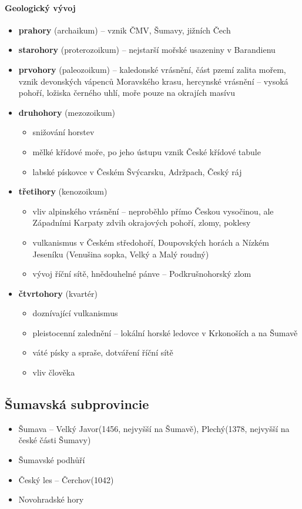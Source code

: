 \paragraph{Geologický vývoj}
\begin{itemize}
\item \textbf{prahory} (archaikum) -- vznik ČMV, Šumavy, jižních Čech
\item \textbf{starohory} (proterozoikum) -- nejstarší mořské usazeniny v Barandienu
\item \textbf{prvohory} (paleozoikum) --  kaledonské vrásnění, část pzemí zalita mořem, vznik devonských vápenců Moravského krasu, hercynské vrásnění -- vysoká pohoří, ložiska černého uhlí, moře pouze na okrajích masívu
\item \textbf{druhohory} (mezozoikum)  
	\begin{itemize}
	\item snižování horstev
	\item mělké křídové moře, po jeho ústupu vznik České křídové tabule
	\item labské pískovce v Českém Švýcarsku, Adržpach, Český ráj
	\end{itemize}
\item \textbf{třetihory} (kenozoikum)
	\begin{itemize}
	\item vliv alpinského vrásnění -- neproběhlo přímo Českou vysočinou, ale Západními Karpaty \ra zdvih okrajových pohoří, zlomy, poklesy
	\item vulkanismus v Českém středohoří, Doupovských horách a Nízkém Jeseníku (Venušina sopka, Velký a Malý roudný)
	\item vývoj říční sítě, hnědouhelné pánve -- Podkrušnohorský zlom
	\end{itemize}
\item \textbf{čtvrtohory} (kvartér)
	\begin{itemize}
	\item doznívající vulkanismus
	\item pleistocenní zalednění -- lokální horské ledovce v Krkonoších a na Šumavě
	\item váté písky a spraše, dotváření říční sítě
	\item vliv člověka
	\end{itemize}
\end{itemize}

\subsection{Šumavská subprovincie}
\begin{itemize}
\item Šumava -- Velký Javor(1456, nejvyšší na Šumavě), Plechý(1378, nejvyšší na české části Šumavy)
\item Šumavské podhůří
\item Český les -- Čerchov(1042)
\item Novohradské hory
\end{itemize}

